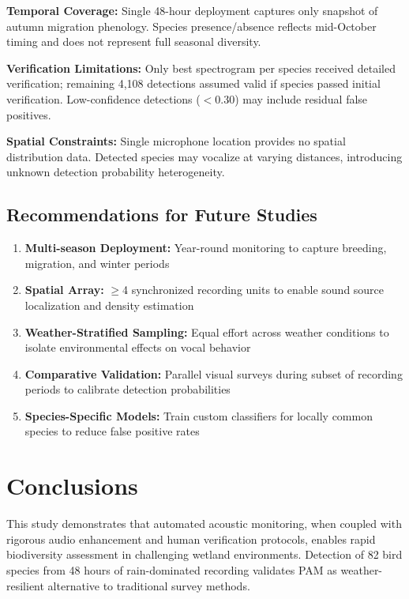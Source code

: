 \documentclass[twocolumn]{article}
\begin{document}
\textbf{Temporal Coverage:} Single 48-hour deployment captures only snapshot of autumn migration phenology. Species presence/absence reflects mid-October timing and does not represent full seasonal diversity.

\textbf{Verification Limitations:} Only best spectrogram per species received detailed verification; remaining 4,108 detections assumed valid if species passed initial verification. Low-confidence detections ($<$0.30) may include residual false positives.

\textbf{Spatial Constraints:} Single microphone location provides no spatial distribution data. Detected species may vocalize at varying distances, introducing unknown detection probability heterogeneity.

\subsection{Recommendations for Future Studies}

\begin{enumerate}
\item \textbf{Multi-season Deployment:} Year-round monitoring to capture breeding, migration, and winter periods

\item \textbf{Spatial Array:} $\geq$4 synchronized recording units to enable sound source localization and density estimation

\item \textbf{Weather-Stratified Sampling:} Equal effort across weather conditions to isolate environmental effects on vocal behavior

\item \textbf{Comparative Validation:} Parallel visual surveys during subset of recording periods to calibrate detection probabilities

\item \textbf{Species-Specific Models:} Train custom classifiers for locally common species to reduce false positive rates
\end{enumerate}

\section{Conclusions}

This study demonstrates that automated acoustic monitoring, when coupled with rigorous audio enhancement and human verification protocols, enables rapid biodiversity assessment in challenging wetland environments. Detection of 82 bird species from 48 hours of rain-dominated recording validates PAM as weather-resilient alternative to traditional survey methods.
\end{document}
